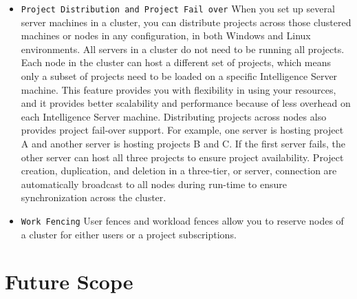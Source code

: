 \documentclass[12pt]{article}
\begin{document}
\begin{itemize}
\item
\texttt{Project Distribution and Project Fail over}
When you set up several server machines in a cluster, you can distribute projects across those clustered machines or nodes in any configuration, in both Windows and Linux environments. All servers in a cluster do not need to be running all projects. Each node in the cluster can host a different set of projects, which means only a subset of projects need to be loaded on a specific Intelligence Server machine. This feature provides you with flexibility in using your resources, and it provides better scalability and performance because of less overhead on each Intelligence Server machine. Distributing projects across nodes also provides project fail-over support. For example, one server is hosting project A and another server is hosting projects B and C. If the first server fails, the other server can host all three projects to ensure project availability. Project creation, duplication, and deletion in a three-tier, or server, connection are automatically broadcast to all nodes during run-time to ensure synchronization across the cluster.
\item
\texttt{Work Fencing}
User fences and workload fences allow you to reserve nodes of a cluster for either users or a project subscriptions. 

\end{itemize}

\newpage
\section{Future Scope}
\end{document}

